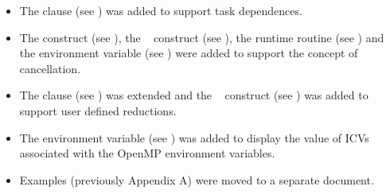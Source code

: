 \begin{itemize}
\item The  clause (see ) was added 
      to support task dependences.

\item The  construct (see ), 
      the ~ construct 
      (see ), the 
       runtime routine 
      (see ) and the 
      environment variable (see ) were added to 
      support the concept of cancellation.

\item The  clause (see ) 
      was extended and the ~ construct 
      (see ) was added to
      support user defined reductions.

\item The  environment variable 
      (see ) was added to display the value of 
      ICVs associated with the OpenMP environment variables.

\item Examples (previously Appendix A) were moved to a separate document.
\end{itemize}



